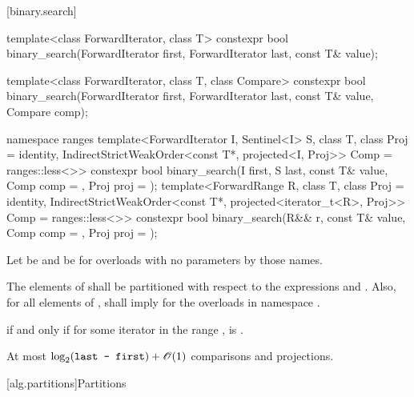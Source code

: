 [binary.search]{}

%
\begin{itemdecl}
template<class ForwardIterator, class T>
  constexpr bool
    binary_search(ForwardIterator first, ForwardIterator last,
                  const T& value);

template<class ForwardIterator, class T, class Compare>
  constexpr bool
    binary_search(ForwardIterator first, ForwardIterator last,
                  const T& value, Compare comp);

namespace ranges {
  template<ForwardIterator I, Sentinel<I> S, class T, class Proj = identity,
      IndirectStrictWeakOrder<const T*, projected<I, Proj>> Comp = ranges::less<>>
    constexpr bool binary_search(I first, S last, const T& value, Comp comp = {},
                                 Proj proj = {});
  template<ForwardRange R, class T, class Proj = identity,
      IndirectStrictWeakOrder<const T*, projected<iterator_t<R>, Proj>> Comp = ranges::less<>>
    constexpr bool binary_search(R&& r, const T& value, Comp comp = {},
                                 Proj proj = {});
}
\end{itemdecl}

\begin{itemdescr}
\pnum
Let  be  and
 be 
for overloads with no parameters by those names.

\pnum
\requires
The elements
of
shall be partitioned with respect to the expressions
 and
.
Also, for all elements
of
\tcode{[first, last)},
shall imply
for the overloads in namespace .

\pnum
\returns
{}
if and only if for some iterator
in the range
,
 is .

\pnum
\complexity
At most
$\log_2(\texttt{last - first}) + \mathscr{O}(1)$
comparisons and projections.
\end{itemdescr}

[alg.partitions]{Partitions}

